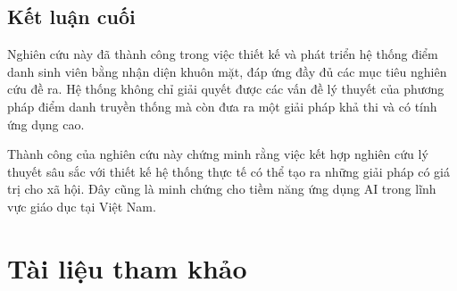 \documentclass[12pt,a4paper]{report}
\begin{document}
\section{Kết luận cuối}
Nghiên cứu này đã thành công trong việc thiết kế và phát triển hệ thống điểm danh sinh viên bằng nhận diện khuôn mặt, đáp ứng đầy đủ các mục tiêu nghiên cứu đề ra. Hệ thống không chỉ giải quyết được các vấn đề lý thuyết của phương pháp điểm danh truyền thống mà còn đưa ra một giải pháp khả thi và có tính ứng dụng cao.

Thành công của nghiên cứu này chứng minh rằng việc kết hợp nghiên cứu lý thuyết sâu sắc với thiết kế hệ thống thực tế có thể tạo ra những giải pháp có giá trị cho xã hội. Đây cũng là minh chứng cho tiềm năng ứng dụng AI trong lĩnh vực giáo dục tại Việt Nam.

\chapter*{Tài liệu tham khảo}

\begin{thebibliography}{0}

\end{thebibliography}
\end{document}
